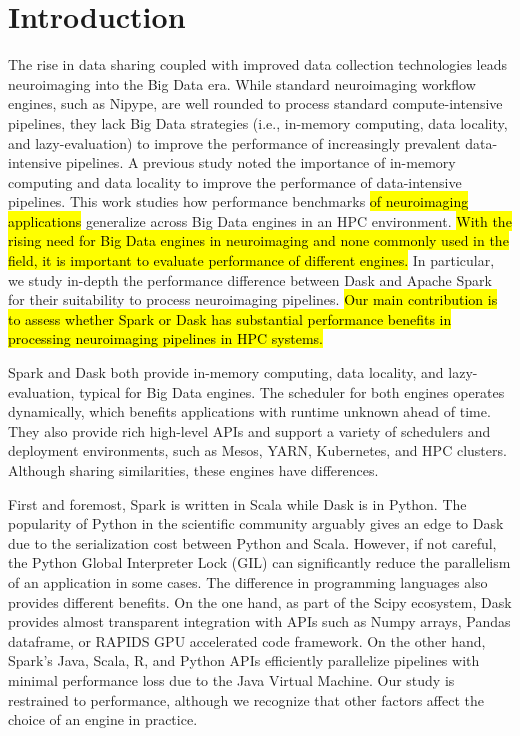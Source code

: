 \documentclass[AMA,STIX1COL]{WileyNJD-v2}
\newcommand{\HL}[1]{\hl{#1}}
\begin{document}
\section{Introduction}
The rise in data sharing coupled with improved data collection technologies leads neuroimaging into the Big Data era\cite{ALFAROALMAGRO2018400, van2014human, ConpPortal}.
While standard neuroimaging workflow engines, such as Nipype\cite{Nipype:11}, are well rounded to process standard compute-intensive pipelines,
they lack Big Data strategies (i.e., in-memory computing, data locality, and lazy-evaluation) to improve the performance of increasingly prevalent data-intensive pipelines.
A previous study\cite{8752675} noted the importance of in-memory computing and data locality to improve the performance of data-intensive pipelines.
This work studies how performance benchmarks \HL{of neuroimaging applications} generalize across Big Data engines in an HPC environment.
\HL{
	With the rising need for Big Data engines in neuroimaging and none commonly used
	in the field, it is important to evaluate performance of different engines.
}
In particular, we study in-depth the performance difference between Dask\cite{Dask:15} and Apache Spark\cite{Spark:16} for their suitability to process neuroimaging pipelines.
\HL{
	Our main contribution is to assess whether Spark or Dask has substantial performance benefits in processing neuroimaging pipelines in HPC systems.
}
	
Spark and Dask both provide in-memory computing, data locality, and lazy-evaluation, typical for Big Data engines.
The scheduler for both engines operates dynamically, which benefits applications with runtime unknown ahead of time\cite{Dask:15}.
They also provide rich high-level APIs and support a variety of schedulers and deployment environments, such as Mesos\cite{hindman2011mesos}, YARN\cite{vavilapalli2013apache}, Kubernetes, and HPC clusters.
Although sharing similarities, these engines have differences.
	
First and foremost, Spark is written in Scala while Dask is in Python.
The popularity of Python in the scientific community arguably gives an edge to Dask due to the serialization cost between Python and Scala.
However, if not careful, the Python Global Interpreter Lock (GIL) can significantly reduce the parallelism of an application in some cases.
The difference in programming languages also provides different benefits.
On the one hand, as part of the Scipy ecosystem, Dask provides almost transparent integration with APIs such as Numpy arrays, Pandas dataframe, or RAPIDS GPU accelerated code framework.
On the other hand, Spark's Java, Scala, R, and Python APIs efficiently parallelize pipelines with minimal performance loss due to the Java Virtual Machine.
Our study is restrained to performance, although we recognize that other factors affect the choice of an engine in practice.
	
\end{document}
